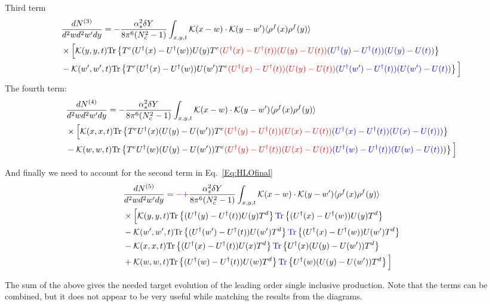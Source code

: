 \documentclass[10pt]{article}
\numberwithin{equation}{section}
\begin{document}
Third term 
\begin{align}
    &\frac{dN^{(3)}}{d^2 w d^2 w' d y} = - \frac{\alpha_s^2 \delta Y}{8 \pi^6 (N_c^2-1)}
\int_{x,y,t} {\cal K}(x-w)\cdot {\cal K}(y-w') \langle\rho^f(x) \rho^f(y) \rangle \notag \\ & \times  
\Big[ 
 {\cal K}(y,y,t) {\rm Tr} \left\{ T^e (U^\dagger(x) - U^\dagger(w)) U(y) T^e \textcolor{red}{( U^\dagger(x) - U^\dagger(t) )  ( U(y) - U(t) )}\textcolor{blue}{( U^\dagger(y) - U^\dagger(t) )  ( U(y) - U(t) )}\right\}
 \notag \\ & -  {\cal K}(w', w',t) {\rm Tr} \left\{ T^e (U^\dagger(x) - U^\dagger(w)) U(w') T^e \textcolor{red}{( U^\dagger(x) - U^\dagger(t) )  ( U(y) - U(t) )}\textcolor{blue}{( U^\dagger(w') - U^\dagger(t) )  ( U(w') - U(t) )}\right\}
\Big] 
\end{align} 
The fourth term:
\begin{align}
    &\frac{dN^{(4)}}{d^2 w d^2 w' d y} = - \frac{\alpha_s^2 \delta Y}{8 \pi^6 (N_c^2-1)}
\int_{x,y,t} {\cal K}(x-w)\cdot {\cal K}(y-w') \langle\rho^f(x) \rho^f(y) \rangle \notag \\ & \times  
\Big[ 
 {\cal K}(x,x,t) {\rm Tr} \left\{ T^e U^\dagger(x) ( U(y) - U(w') ) T^e \textcolor{red}{( U^\dagger(y) - U^\dagger(t) )  ( U(x) - U(t) )}\textcolor{blue}{( U^\dagger(x) - U^\dagger(t) )  ( U(x) - U(t) )} )\right\}
 \notag \\ & -  {\cal K}(w, w,t) {\rm Tr} \left\{ T^e U^\dagger(w) ( U(y) - U(w') )  T^e \textcolor{red}{( U^\dagger(y) - U^\dagger(t) )  ( U(x) - U(t) )}\textcolor{blue}{( U^\dagger(w) - U^\dagger(t) )  ( U(w) - U(t) )} )\right\}
\Big] 
\end{align} 


And finally we need to account for the second term in Eq.~\eqref{Eq:HLOfinal} 
\begin{align}
    &\frac{dN^{(5)}}{d^2 w d^2 w' d y} =  \textcolor{red}{-}\textcolor{blue}{+}\frac{\alpha_s^2 \delta Y}{8 \pi^6 (N_c^2-1)}
\int_{x,y,t} {\cal K}(x-w)\cdot {\cal K}(y-w') \langle\rho^f(x) \rho^f(y) \rangle \notag \\ & \times  
\Big[ 
 {\cal K}(y,y,t) {\rm Tr} \left\{ (U^\dagger(y) -U^\dagger(t) ) U(y) T^d \right\} \textcolor{blue}{{\rm Tr}}\left\{ (U^\dagger(x) -U^\dagger(w) ) U(y) T^d \right\} \notag \\ &
 -  {\cal K}(w',w',t) {\rm Tr} \left\{ (U^\dagger(w') -U^\dagger(t) ) U(w') T^d \right\} \textcolor{blue}{{\rm Tr}}\left\{ (U^\dagger(x) -U^\dagger(w) ) U(w') T^d \right\}
\notag \\ &
 -  {\cal K}(x,x,t) {\rm Tr} \left\{ (U^\dagger(x) -U^\dagger(t) ) U(x) T^d \right\} 
 \textcolor{blue}{{\rm Tr}}\left\{ U^\dagger(x)  (U(y) - U(w')) T^d \right\}
\notag \\ & 
+ {\cal K}(w,w,t) {\rm Tr} \left\{ (U^\dagger(w) -U^\dagger(t) ) U(w) T^d \right\} 
 \textcolor{blue}{{\rm Tr}}\left\{ U^\dagger(w)  (U(y) - U(w')) T^d \right\}
\Big] 
\end{align} 


The sum of the above gives the needed target evolution of the leading order single inclusive production. 
Note that the terms can be combined, but it does not appear to be very useful while matching the results from the diagrams.
\end{document}
